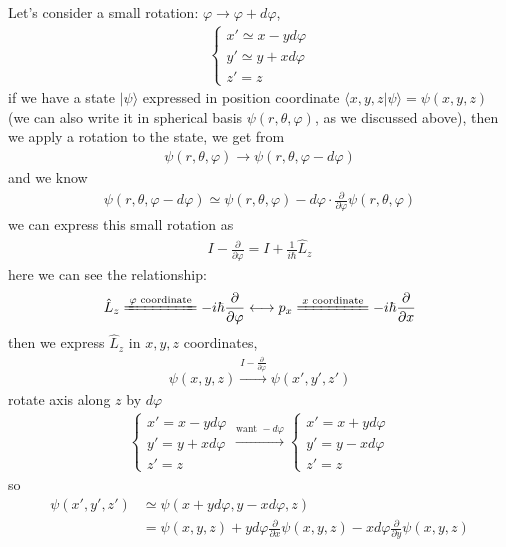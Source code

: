 \documentclass[UTF8,12pt]{article} %
\begin{document}
Let's consider a small rotation: $\varphi \rightarrow \varphi + d\varphi$,
\begin{align}
\begin{cases}
x' \simeq x - yd\varphi \\
y' \simeq y + xd\varphi \\
z' = z
\end{cases}
\end{align}
if we have a state $|\psi\rangle$ expressed in position coordinate $\langle x,y,z|\psi\rangle = \psi(x,y,z)$ (we can also write it in spherical basis $\psi(r,\theta,\varphi)$, as we discussed above), then we apply a rotation to the state, we get from
\begin{align}
\psi(r,\theta,\varphi) \rightarrow \psi(r,\theta,\varphi - d\varphi)
\end{align}
and we know
\begin{align}
\psi(r,\theta,\varphi - d\varphi) \simeq \psi(r,\theta,\varphi) - d\varphi \cdot \frac{\partial}{\partial \varphi} \psi(r,\theta,\varphi)
\end{align}
we can express this small rotation as
\begin{align}
I - \frac{\partial}{\partial\varphi} = I + \frac{1}{i\hbar}\hat{L}_{z}
\end{align}
here we can see the relationship:
\begin{align}
\hat{L}_{z} \xlongequal{\varphi\text{ coordinate}} -i\hbar\frac{\partial}{\partial\varphi} \longleftrightarrow p_{x} \xlongequal{x\text{ coordinate}} -i\hbar\frac{\partial}{\partial x}
\end{align}
then we express $\hat{L}_{z}$ in $x,y,z$ coordinates,
\begin{align}
\psi(x,y,z) \xrightarrow{I - \frac{\partial}{\partial \varphi}} \psi(x', y', z')
\end{align}
rotate axis along $z$ by $d\varphi$
\begin{align}
\begin{cases}
x' = x - yd\varphi \\
y' = y + xd\varphi \\
z' = z
\end{cases}
\xrightarrow{\text{want } -d\varphi}
\begin{cases}
x' = x + yd\varphi \\
y' = y - xd\varphi \\
z' = z
\end{cases}
\end{align}
so
\begin{align}
\psi(x', y', z') &\simeq \psi(x + yd\varphi, y - xd\varphi,z) \\
&= \psi(x,y,z) + yd\varphi\frac{\partial}{\partial x}\psi(x,y,z) - xd\varphi\frac{\partial}{\partial y}\psi(x,y,z)
\end{align}
\end{document}
